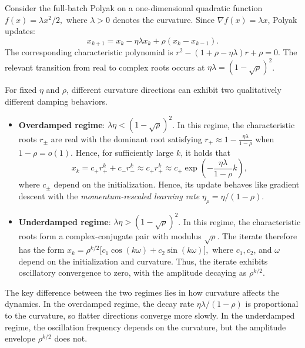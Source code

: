 \documentclass[11pt]{article}
\begin{document}
Consider the full-batch Polyak on a one-dimensional quadratic function
$
f(x)=\lambda x^2/2,
$
where \(\lambda>0\) denotes the curvature. Since $\nabla f(x)=\lambda x$, Polyak updates:
\begin{equation}\label{eqn: polyak-1}
x_{k+1} =  x_k-\eta\lambda x_k+\rho(x_k-x_{k-1}).
\end{equation}
The corresponding characteristic polynomial is
$
r^2-(1+\rho-\eta\lambda)r+\rho=0.
$
The relevant transition from real to complex roots occurs at $\eta\lambda= (1-\sqrt{\rho})^2$. 

For fixed \(\eta\) and \(\rho\), different curvature directions can
exhibit two qualitatively different damping behaviors.
\begin{itemize}
    \item \textbf{Overdamped regime}: $\lambda \eta  < (1-\sqrt{\rho})^2$. In this regime, the characteristic roots $r_{\pm}$  are real with the dominant root
satisfying
$
r_+
\approx
1-\frac{\eta\lambda}{1-\rho}
$
when $1-\rho=o(1)$.
Hence, for sufficiently large $k$, it holds that
\[
x_k =c_{+} r_{+}^k + c_{-} r_{-}^k \approx c_{+} r_{+}^k 
\approx
c_{+}\exp\left(
-\frac{\eta\lambda}{1-\rho}k
\right),
\]
where $c_{\pm}$ depend on the initialization. Hence, its update
behaves like gradient descent with the {\it momentum-rescaled learning rate} 
$
\eta_{\rho} = \eta/(1-\rho).
$

\item \textbf{Underdamped regime}: $\lambda\eta > (1-\sqrt{\rho})^2$. In this regime, the characteristic roots form a complex-conjugate pair with modulus
\(\sqrt{\rho}\). The iterate therefore has the form
$
x_k
=
\rho^{k/2}
\bigl[c_1\cos(k\omega)+c_2\sin(k\omega)\bigr],
$
where \(c_1,c_2\), and \(\omega\) depend on the initialization and curvature. Thus, the iterate exhibits oscillatory convergence to zero, with the amplitude decaying as \(\rho^{k/2}\). 
\end{itemize}


The key difference between the two regimes lies in how curvature affects
the dynamics. In the overdamped regime, the decay rate
\(\eta\lambda/(1-\rho)\) is proportional to the curvature, so flatter
directions converge more slowly. In the underdamped regime, the
oscillation frequency depends on the curvature, but the amplitude
envelope \(\rho^{k/2}\) does not.
\end{document}
